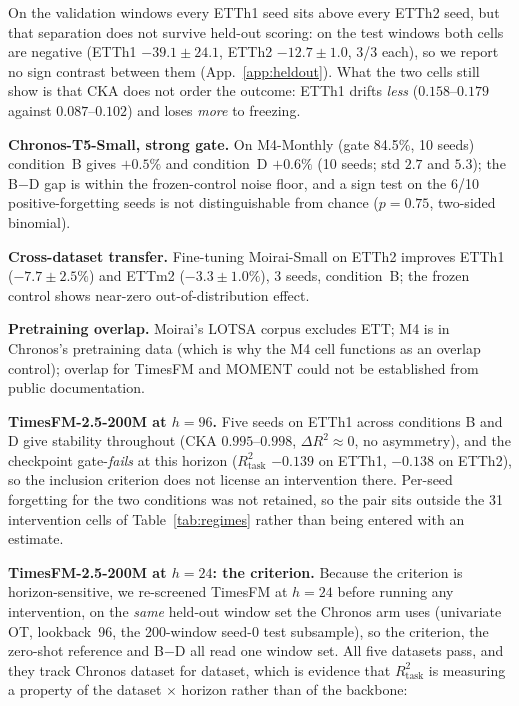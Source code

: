 \documentclass{article}
\begin{document}
On the validation windows every ETTh1 seed sits above every ETTh2 seed, but that separation does
not survive held-out scoring: on the test windows both cells are negative (ETTh1 $-39.1{\pm}24.1$,
ETTh2 $-12.7{\pm}1.0$, 3/3 each), so we report no sign contrast between them
(App.~\ref{app:heldout}). What the two cells still
show is that CKA does not order the outcome: ETTh1 drifts \emph{less} ($0.158$--$0.179$ against
$0.087$--$0.102$) and loses \emph{more} to freezing.

\textbf{Chronos-T5-Small, strong gate.}
On M4-Monthly (gate 84.5\%, 10 seeds) condition~B gives $+0.5\%$ and condition~D $+0.6\%$ (10 seeds; std $2.7$ and $5.3$); the B$-$D gap is within the frozen-control noise floor, and a sign test on the 6/10 positive-forgetting seeds is not distinguishable from chance ($p{=}0.75$, two-sided binomial).

\textbf{Cross-dataset transfer.}
Fine-tuning Moirai-Small on ETTh2 improves ETTh1 ($-7.7{\pm}2.5\%$) and ETTm2 ($-3.3{\pm}1.0\%$), 3 seeds, condition~B; the frozen control shows near-zero out-of-distribution effect.

\textbf{Pretraining overlap.}
Moirai's LOTSA corpus excludes ETT; M4 is in Chronos's pretraining data (which is why the M4 cell functions as an overlap control); overlap for TimesFM and MOMENT could not be established from public documentation.

\textbf{TimesFM-2.5-200M at $h{=}96$.}
Five seeds on ETTh1 across conditions B and D give stability throughout (CKA $0.995$--$0.998$,
$\Delta R^2 \approx 0$, no asymmetry), and the checkpoint gate-\emph{fails} at this horizon
($R^2_\text{task}$ $-0.139$ on ETTh1, $-0.138$ on ETTh2), so the inclusion criterion does not license an
intervention there. Per-seed forgetting for the two conditions was not retained, so the pair sits
outside the 31 intervention cells of Table~\ref{tab:regimes} rather than being entered with an
estimate.

\textbf{TimesFM-2.5-200M at $h{=}24$: the criterion.}
Because the criterion is horizon-sensitive, we re-screened TimesFM at $h{=}24$ before running any
intervention, on the \emph{same} held-out window set the Chronos arm uses (univariate OT,
lookback~96, the 200-window seed-0 test subsample), so the criterion, the zero-shot reference and
B$-$D all read one window set. All five datasets pass, and they track Chronos dataset for dataset,
which is evidence that $R^2_\text{task}$ is measuring a property of the dataset $\times$ horizon
rather than of the backbone:
\end{document}
